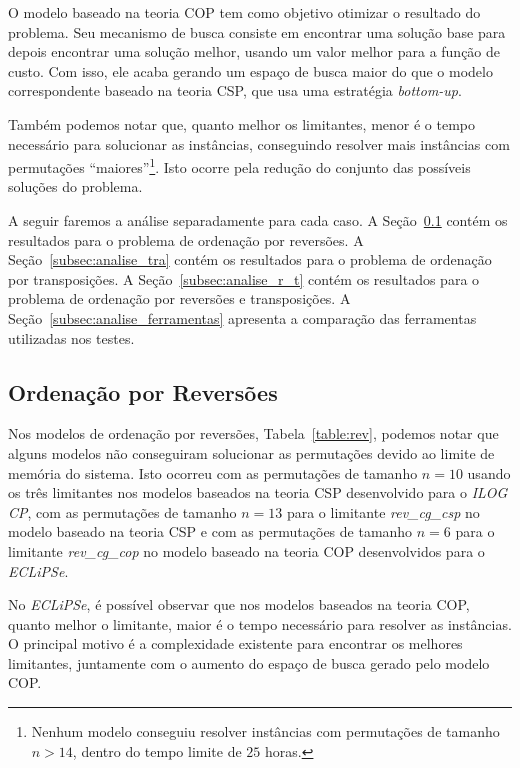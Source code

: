 O modelo baseado na teoria COP tem como objetivo otimizar o resultado do
problema. Seu mecanismo de busca consiste em encontrar uma solução base
para depois encontrar uma solução melhor, usando um valor melhor para a
função de custo. Com isso, ele acaba gerando um espaço de busca maior do
que o modelo correspondente baseado na teoria CSP, que usa uma
estratégia \textit{bottom-up}.

Também podemos notar que, quanto melhor os limitantes, menor é o tempo
necessário para solucionar as instâncias, conseguindo resolver mais
instâncias com permutações ``maiores''\footnote{Nenhum modelo conseguiu
resolver instâncias com permutações de tamanho $n > 14$, dentro do
tempo limite de $25$ horas.}. Isto ocorre pela redução do conjunto das
possíveis soluções do problema.

A seguir faremos a análise separadamente para cada caso. A
Seção~\ref{subsec:analise_rev} contém os resultados para o problema de
ordenação por reversões. A Seção~\ref{subsec:analise_tra} contém os
resultados para o problema de ordenação por transposições. A
Seção~\ref{subsec:analise_r_t} contém os resultados para o problema de
ordenação por reversões e transposições. A
Seção~\ref{subsec:analise_ferramentas} apresenta a comparação das
ferramentas utilizadas nos testes.

\subsection{Ordenação por Reversões}
\label{subsec:analise_rev}
Nos modelos de ordenação por reversões, Tabela~\ref{table:rev}, podemos
notar que alguns modelos não conseguiram solucionar as permutações
devido ao limite de memória do sistema. Isto ocorreu com as permutações
de tamanho $n = 10$ usando os três limitantes nos modelos baseados na
teoria CSP desenvolvido para o \textit{ILOG CP}, com as permutações de
tamanho $n = 13$ para o limitante \textit{rev\_cg\_csp} no modelo
baseado na teoria CSP e com as permutações de tamanho $n = 6$ para o
limitante \textit{rev\_cg\_cop} no modelo baseado na teoria COP
desenvolvidos para o \textit{ECLiPSe}.

No \textit{ECLiPSe}, é possível observar que nos modelos baseados na
teoria COP, quanto melhor o limitante, maior é o tempo necessário para
resolver as instâncias. O principal motivo é a complexidade existente
para encontrar os melhores limitantes, juntamente com o aumento do
espaço de busca gerado pelo modelo COP. 

